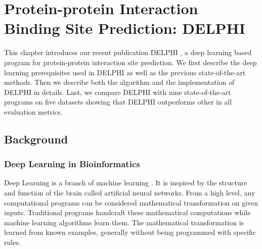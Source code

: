 \chapter{Protein-protein Interaction Binding Site Prediction: DELPHI \label{chap_2}}
This chapter introduces our recent publication DELPHI \cite{li2020delphi, li2020delphi_ISMB}, a deep learning based program for protein-protein interaction site prediction. We first describe the deep learning prerequisites used in DELPHI as well as the previous state-of-the-art methods. Then we describe both the algorithm and the implementation of DELPHI in details. Last, we compare DELPHI with nine state-of-the-art programs on five datasets showing that DELPHI outperforms other in all evaluation metrics. 
\section{Background}
\subsection{Deep Learning in Bioinformatics} \label{set_AI_in_bioinfor}
Deep Learning is a branch of machine learning \cite{goodfellow2016deep}. It is inspired by the structure and function of the brain called artificial neural networks. From a high level, any computational programs can be considered mathematical transformation on given inputs. Traditional programs handcraft these mathematical computations while machine learning algorithms learn them. The mathematical transformation is learned from known examples, generally without being programmed with specific rules.


